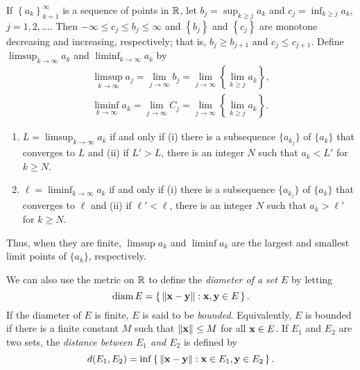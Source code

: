 If $\left\{ a_k \right\}_{k=1}^\infty$ is a sequence of points in $\mathbb{R}$,
let $b_j=\sup_{k\geq j} a_k$ and $c_j=\inf_{k\geq j} a_k$,
$j=1,2,\dotsc$. Then $-\infty\leq c_j\leq b_j\leq\infty$ and $\left\{ b_j
\right\}$ and $\left\{ c_j \right\}$ are monotone decreasing and
increasing, respectively; that is, $b_j\geq b_{j+1}$ and $c_j\leq
c_{j+1}$. Define $\limsup_{k\to\infty} a_k$ and $\liminf_{k\to\infty} a_k$
by
\begin{equation}
\label{eq:limsup-liminf-e-k}
\begin{aligned}
\limsup_{k\to\infty} a_j=
\lim_{j\to\infty}b_j=
\lim_{j\to\infty}\left\{\lim_{k\geq j} a_k\right\},\\
\liminf_{k\to\infty} a_k=
\lim_{j\to\infty} C_j=
\lim_{j\to\infty}\left\{\lim_{k\geq j} a_k\right\}.
\end{aligned}
\end{equation}
\begin{theorem}[1.4]
\begin{enumerate}[label=\textnormal{(\alph*)}]
\item $L=\limsup_{k\to\infty} a_k$ if and only if (i) there is a
  subsequence $\{a_{k_j}\}$ of $\{a_k\}$ that   converges to $L$ and (ii)
  if $L'>L$, there is an integer $N$ such that $a_k<L'$ for $k\geq N$.
\item $\ell=\liminf_{k\to\infty} a_k$ if and only if (i) there is a
  subsequence $\{a_{k_j}\}$ of $\{a_k\}$ that converges to $\ell$ and (ii)
  if $\ell'<\ell$, there is an integer $N$ such that $a_k>\ell'$ for $k\geq
  N$.
\end{enumerate}
\end{theorem}

Thus, when they are finite, $\limsup a_k$ and $\liminf a_k$ are the
largest and smallest limit points of $\{a_k\}$, respectively.

We can also use the metric on $\mathbb{R}$ to define the \emph{diameter of a set
  $E$} by letting
\begin{equation}
  \label{eq:diameter-of-set}
\operatorname{diam} E=\left\{\,\|\mathbf{x}-\mathbf{y}\|:\mathbf{x},\mathbf{y}\in E\,\right\}.
\end{equation}
If the diameter of $E$ is finite, $E$ is said to be
\emph{bounded}. Equivalently, $E$ is bounded if there is a finite constant
$M$ such  that $\|\mathbf{x}\|\leq M$ for all $\mathbf{x}\in E$. If $E_1$ and $E_2$ are
two sets, the \emph{distance between $E_1$ and $E_2$} is defined by
\begin{equation}
  \label{eq:distance-e-1-e-2}
d(E_1,E_2)=\inf\left\{\,\|\mathbf{x}-\mathbf{y}\|:\mathbf{x}\in E_1,\mathbf{y}\in E_2\,\right\}.
\end{equation}

